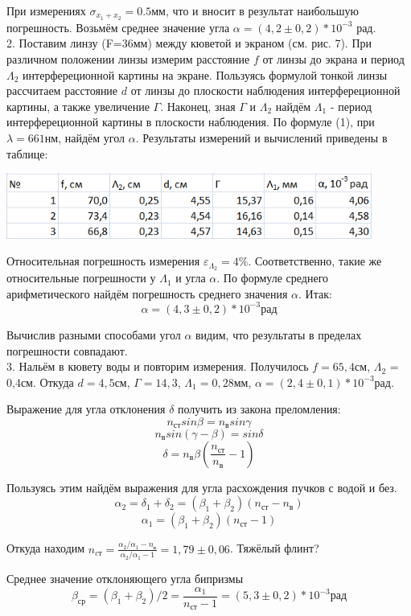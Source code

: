 \documentclass[12pt]{article}
\begin{document}
    При измерениях $\sigma_{x_1 + x_2} = 0.5 мм$, что и вносит в результат наибольшую погрешность. Возьмём среднее значение угла $\alpha = (4,2 \pm 0,2) * 10^{-3}$ рад.\\
    
    2. Поставим линзу (F=36мм) между кюветой и экраном (см. рис. 7). При различном положении линзы измерим расстояние $f$ от линзы до экрана и период $\Lambda_2$ интерфереционной картины на экране. Пользуясь формулой тонкой линзы рассчитаем расстояние $d$ от линзы до плоскости наблюдения интерфереционной картины, а также увеличение $\Gamma$. Наконец, зная $\Gamma$ и $\Lambda_2$ найдём $\Lambda_1$ - период интерфереционной картины в плоскости наблюдения. По формуле (1), при $\lambda = 661 нм$, найдём угол $\alpha$. Результаты измерений и вычислений приведены в таблице:
    
    \begin{center}
    	\includegraphics[width=12cm]{table2.png}
    \end{center}
    
    Относительная погрешность измерения $\varepsilon_{\Lambda_2} = 4\%$. Соответственно, такие же относительные погрешности у $\Lambda_1$ и угла $\alpha$. По формуле среднего арифметического найдём погрешность среднего значения $\alpha$. Итак: $$\alpha = (4,3 \pm 0,2) * 10^{-3} рад$$
    
    Вычислив разными способами угол $\alpha$ видим, что результаты в пределах погрешности совпадают.\\
    
    3. Нальём в кювету воды и повторим измерения. Получилось $f = 65,4см$, $\Lambda_2$ = 0,4см. Откуда $d=4,5см$, $\Gamma=14,3$, $\Lambda_1=0,28мм$, $\alpha=(2,4 \pm 0,1) * 10^{-3} рад$.
    
    Выражение для угла отклонения $\delta$ получить из закона преломления: $$n_{ст}sin\beta = n_в sin\gamma$$ $$n_в sin(\gamma - \beta) = sin\delta$$
    $$\delta = n_в \beta (\frac{n_{ст}}{n_в} - 1)$$
    
    Пользуясь этим найдём выражения для угла расхождения пучков с водой и без.
    $$\alpha_2 = \delta_1 + \delta_2 = (\beta_1 + \beta_2) (n_{ст} - n_в)$$
    $$\alpha_1 = (\beta_1 + \beta_2) (n_{ст} - 1)$$
    
    Откуда находим $n_{cт} = \frac{\alpha_2 / \alpha_1 - n_в}{\alpha_2 / \alpha_1 - 1} = 1,79 \pm 0,06$. Тяжёлый флинт?
    
    Среднее значение отклоняющего угла бипризмы $$\beta_{ср} = (\beta_1 + \beta_2) / 2 = \frac{\alpha_1}{n_{ст} - 1} = (5,3 \pm 0,2) * 10^{-3} рад$$
\end{document}
